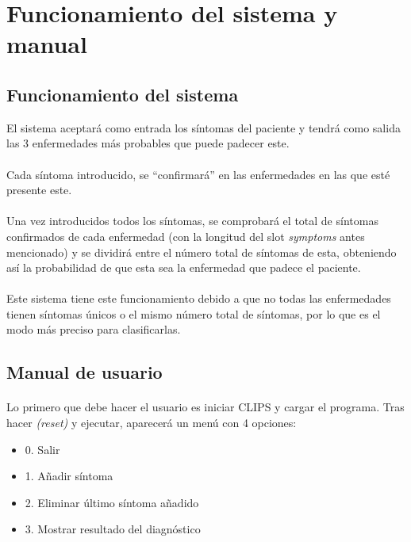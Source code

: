 \documentclass{article}
\begin{document}
    \section{Funcionamiento del sistema y manual}
    \subsection{Funcionamiento del sistema}
    El sistema aceptará como entrada los síntomas del paciente y tendrá como salida las 3 enfermedades más probables que puede padecer este.
    \paragraph{}
    Cada síntoma introducido, se “confirmará” en las enfermedades en las que esté presente este.
    \paragraph{}
    Una vez introducidos todos los síntomas, se comprobará el total de síntomas confirmados de cada enfermedad (con la longitud del slot \emph{symptoms} antes mencionado) y se dividirá entre el número total de síntomas de esta, obteniendo así la probabilidad de que esta sea la enfermedad que padece el paciente.
    \paragraph{}
    Este sistema tiene este funcionamiento debido a que no todas las enfermedades tienen síntomas únicos o el mismo número total de síntomas, por lo que es el modo más preciso para clasificarlas.
    \subsection{Manual de usuario}
    \paragraph{}
    Lo primero que debe hacer el usuario es iniciar CLIPS y cargar el programa. Tras hacer \emph{(reset)} y ejecutar, aparecerá un menú con 4 opciones:
    \begin{itemize}
        \item 0. Salir
        \item 1. Añadir síntoma
        \item 2. Eliminar último síntoma añadido
        \item 3. Mostrar resultado del diagnóstico
    \end{itemize}
\end{document}
